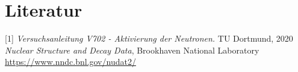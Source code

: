\newpage
\section{Literatur}
    [1] \textit{Versuchsanleitung V702 - Aktivierung der Neutronen.} TU Dortmund, 2020 \newline
    [2] \textit{Nuclear Structure and Decay Data}, Brookhaven National Laboratory \newline
    \url{https://www.nndc.bnl.gov/nudat2/}
